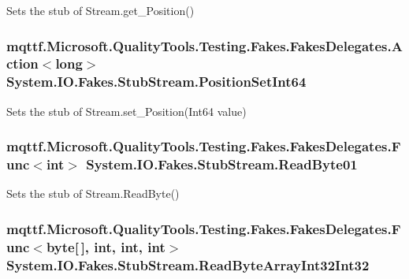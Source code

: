 Sets the stub of Stream.\-get\-\_\-\-Position()

\hypertarget{class_system_1_1_i_o_1_1_fakes_1_1_stub_stream_a5156555f6083382e5af5b808ea90f41f}{
\subsubsection[{Position\-Set\-Int64}]{\setlength{\rightskip}{0pt plus 5cm}mqttf.\-Microsoft.\-Quality\-Tools.\-Testing.\-Fakes.\-Fakes\-Delegates.\-Action$<$long$>$ System.\-I\-O.\-Fakes.\-Stub\-Stream.\-Position\-Set\-Int64}}\label{class_system_1_1_i_o_1_1_fakes_1_1_stub_stream_a5156555f6083382e5af5b808ea90f41f}


Sets the stub of Stream.\-set\-\_\-\-Position(\-Int64 value)

\hypertarget{class_system_1_1_i_o_1_1_fakes_1_1_stub_stream_af0477adfadb164c170405d327b846f5e}{
\subsubsection[{Read\-Byte01}]{\setlength{\rightskip}{0pt plus 5cm}mqttf.\-Microsoft.\-Quality\-Tools.\-Testing.\-Fakes.\-Fakes\-Delegates.\-Func$<$int$>$ System.\-I\-O.\-Fakes.\-Stub\-Stream.\-Read\-Byte01}}\label{class_system_1_1_i_o_1_1_fakes_1_1_stub_stream_af0477adfadb164c170405d327b846f5e}


Sets the stub of Stream.\-Read\-Byte()

\hypertarget{class_system_1_1_i_o_1_1_fakes_1_1_stub_stream_aa2dcdc4a1ecece49ffbcf678287d6262}{
\subsubsection[{Read\-Byte\-Array\-Int32\-Int32}]{\setlength{\rightskip}{0pt plus 5cm}mqttf.\-Microsoft.\-Quality\-Tools.\-Testing.\-Fakes.\-Fakes\-Delegates.\-Func$<$byte\mbox{[}$\,$\mbox{]}, int, int, int$>$ System.\-I\-O.\-Fakes.\-Stub\-Stream.\-Read\-Byte\-Array\-Int32\-Int32}}\label{class_system_1_1_i_o_1_1_fakes_1_1_stub_stream_aa2dcdc4a1ecece49ffbcf678287d6262}


